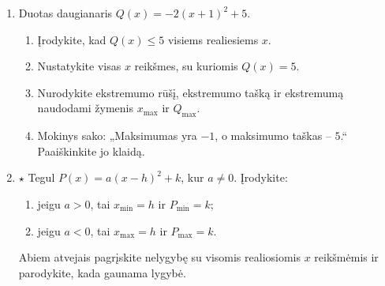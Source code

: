 \documentclass[12pt,a4paper]{article}
\begin{document}
\begin{enumerate}
\textit{Pastaba.} Ekstremumo taškas – tai $x$ reikšmė, su kuria pasiekiamas ekstremumas. Jis yra realusis skaičius, o ne skaičių pora. Ekstremumas yra su šia $x$ reikšme gaunama daugianario reikšmė. Kvadratinio daugianario ekstremumo taškas yra vienintelis; tai pagrįsime 5 uždavinyje.
\begin{enumerate}
\item Remdamiesi apibrėžimu užrašykite 2 uždavinio atsakymą naudodami $x_{\min}$ ir $P_{\min}$.
\item Ką reiškia lygybės $x_{\min}=2$ ir $P_{\min}=3$? Kuris skaičius yra $x$ reikšmė, o kuris – daugianario reikšmė?
\item Ar norint įrodyti, kad $3$ yra minimumas, pakanka vien parodyti $P(2)=3$? Kokį teiginį dar reikia pagrįsti?
\end{enumerate}
\par\medskip
\textbf{Sustokite ir apibendrinkite.} Kuo skiriasi minimumo taškas ir minimumas? Kodėl nepakanka parodyti, kad $P(x_0)$ lygi siūlomai mažiausiajai reikšmei?
\item Duotas daugianaris $Q(x)=-2(x+1)^2+5$.
\begin{enumerate}
\item Įrodykite, kad $Q(x)\le5$ visiems realiesiems $x$.
\item Nustatykite visas $x$ reikšmes, su kuriomis $Q(x)=5$.
\item Nurodykite ekstremumo rūšį, ekstremumo tašką ir ekstremumą naudodami žymenis $x_{\max}$ ir $Q_{\max}$.
\item Mokinys sako: „Maksimumas yra $-1$, o maksimumo taškas – $5$.“ Paaiškinkite jo klaidą.
\end{enumerate}
\item $\star$ Tegul $P(x)=a(x-h)^2+k$, kur $a\ne0$. Įrodykite:
\begin{enumerate}
\item jeigu $a>0$, tai $x_{\min}=h$ ir $P_{\min}=k$;
\item jeigu $a<0$, tai $x_{\max}=h$ ir $P_{\max}=k$.
\end{enumerate}
Abiem atvejais pagrįskite nelygybę su visomis realiosiomis $x$ reikšmėmis ir parodykite, kada gaunama lygybė.


\end{enumerate}
\end{document}

